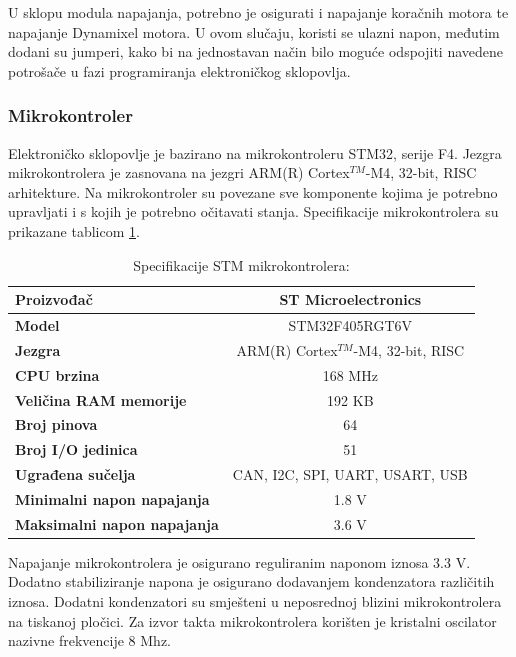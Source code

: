 \documentclass[11pt,a4paper]{article}
\begin{document}
U sklopu modula napajanja, potrebno je osigurati i napajanje koračnih motora te napajanje Dynamixel motora. U ovom slučaju, koristi se ulazni napon, međutim dodani su jumperi, kako bi na jednostavan način bilo moguće odspojiti navedene potrošače u fazi programiranja elektroničkog sklopovlja.

\subsubsection{Mikrokontroler}
 Elektroničko sklopovlje je bazirano na mikrokontroleru STM32, serije F4. Jezgra mikrokontrolera je zasnovana na jezgri ARM(R) Cortex$^{TM}$-M4, 32-bit, RISC arhitekture. Na mikrokontroler su povezane sve komponente kojima je potrebno upravljati i s kojih je potrebno očitavati stanja. Specifikacije mikrokontrolera su prikazane tablicom \ref{tab:specifikacija_MCU}.

\begin{table}[H]
	\centering
	\caption{Specifikacije STM mikrokontrolera: }
	\label{tab:specifikacija_MCU}
	\begin{tabular}{|l|c|}
		\hline
		\textbf{Proizvođač} & ST Microelectronics \\ \hline 
		\textbf{Model} &  STM32F405RGT6V \\ \hline 
		\textbf{Jezgra} &  ARM(R) Cortex$^{TM}$-M4, 32-bit, RISC  \\ \hline 
		\textbf{CPU brzina} & 168 MHz \\ \hline 
		\textbf{Veličina RAM memorije} & 192 KB \\ \hline 
		\textbf{Broj pinova} & 64 \\ \hline 
		\textbf{Broj I/O jedinica} & 51 \\ \hline 
		\textbf{Ugrađena sučelja} & CAN, I2C, SPI, UART, USART, USB\\ \hline 
		\textbf{Minimalni napon napajanja} & 1.8 V\\ \hline 
		\textbf{Maksimalni napon napajanja} & 3.6 V\\ \hline 
	\end{tabular}
\end{table}

Napajanje mikrokontrolera je osigurano reguliranim naponom iznosa 3.3 V. Dodatno stabiliziranje napona je osigurano dodavanjem kondenzatora različitih iznosa. Dodatni kondenzatori su smješteni u neposrednoj blizini mikrokontrolera na tiskanoj pločici.
Za izvor takta mikrokontrolera korišten je kristalni oscilator nazivne frekvencije 8 Mhz.
\end{document}
